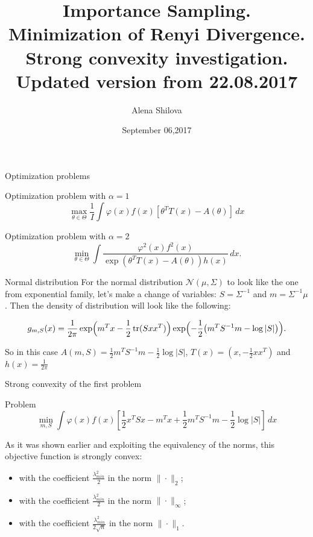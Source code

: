 \documentclass[10pt]{beamer}
\title{Importance Sampling. \\ Minimization of Renyi Divergence. \\
Strong convexity investigation. \\
Updated version from 22.08.2017}
\author{Alena Shilova}
\date{September 06,2017}
\institute{Skoltech}
\DeclareMathOperator{\tr}{tr}
\begin{document}
\maketitle


\begin{frame}{Optimization problems}

\begin{block}{Optimization problem with $\alpha  = 1$}
\[
\max_{\theta \in \Theta} \frac 1I \int  \varphi(x) f(x) \left[ \theta^T T(x) - A(\theta) \right] \, dx
\]
\end{block}

\begin{block}{Optimization problem with $\alpha = 2$}
\[
 \min_{\theta \in \Theta} \int \frac{\varphi^2(x)f^2(x)}{\exp(\theta^TT(x) - A(\theta))h(x)} \, dx. 
\]
\end{block}

\end{frame}

\begin{frame}{Normal distribution}
For the normal distribution $\mathcal{N} (\mu, \Sigma)$ to look like the one from exponential family, let's make a change of variables: $S = \Sigma^{-1}$ and $m = \Sigma^{-1} \mu$. Then the density of distribution will look like the following:

\[
g_{m,S}(x) = \frac1{2\pi} \exp \Bigl( m^T x - \frac 12 \tr( Sxx^T ) \Bigr) \exp \Bigl(- \frac 1 2 \bigl( m^TS^{-1}m - \log |S| \bigr) \Bigr).
\]

So in this case $A(m, S) = \frac 12 m^TS^{-1} m - \frac 12 \log |S|$, $T(x) = (x, -\frac 12 xx^T)$ and $h(x) = \frac 1{2\pi}$

\end{frame}

\begin{frame}{Strong convexity of the first problem}
\begin{block}{Problem}
\[
\min_{m,S} \int \varphi(x)f(x)\left[\frac12 x^TSx - m^Tx + \frac12 m^T S^{-1}m - \frac 12 \log |S|  \right] \, dx
\]
\end{block}

As it was shown earlier and exploiting the equivalency of the norms, this objective function is strongly convex:
\begin{itemize}
\item with the coefficient $\frac{\lambda_{min}^2}{2}$ in the norm $\|\cdot\|_2$;
\item with the coefficient $\frac{\lambda_{min}^2}{2}$ in the norm $\|\cdot\|_{\infty}$;
\item with the coefficient $\frac{\lambda_{min}^2}{2 \sqrt{n}}$ in the norm $\|\cdot\|_{1}$.

\end{itemize}
\end{frame}
\end{document}
